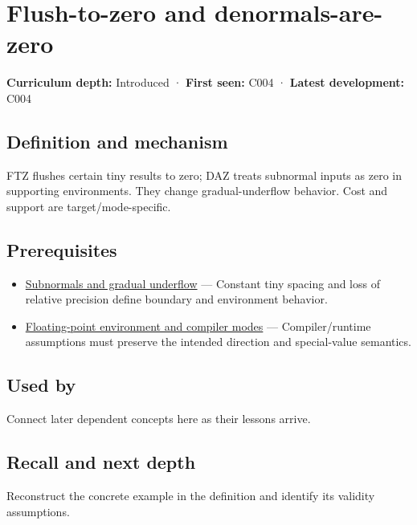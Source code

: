 \hypertarget{appendix-e979eb012782}{}
\section{Flush-to-zero and denormals-are-zero}\label{appendix-e979eb012782-flush-to-zero-and-denormals-are-zero}

\textbf{Curriculum depth:} Introduced · \textbf{First seen:} C004 · \textbf{Latest development:} C004

\subsection{Definition and mechanism}\label{appendix-e979eb012782-definition-and-mechanism}

FTZ flushes certain tiny results to zero; DAZ treats subnormal inputs as zero in supporting environments. They change gradual-underflow behavior. Cost and support are target/mode-specific.

\subsection{Prerequisites}\label{appendix-e979eb012782-prerequisites}

\begin{itemize}
\tightlist
\item
  \hyperref[appendix-00a6e044c437]{Subnormals and gradual underflow} --- Constant tiny spacing and loss of relative precision define boundary and environment behavior.
\item
  \hyperref[appendix-f11d1a521253]{Floating-point environment and compiler modes} --- Compiler/runtime assumptions must preserve the intended direction and special-value semantics.
\end{itemize}

\subsection{Used by}\label{appendix-e979eb012782-used-by}

Connect later dependent concepts here as their lessons arrive.

\subsection{Recall and next depth}\label{appendix-e979eb012782-recall-and-next-depth}

Reconstruct the concrete example in the definition and identify its validity assumptions.

